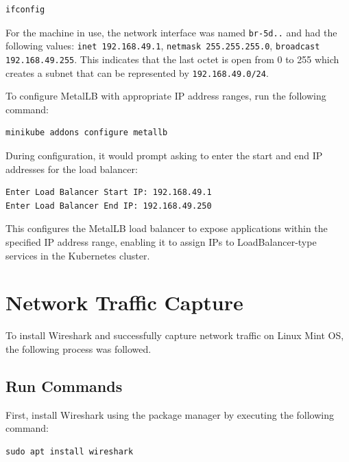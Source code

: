 \begin{lstlisting}[breaklines=true,basicstyle=\small\ttfamily,frame=single]
ifconfig
\end{lstlisting}

For the machine in use, the network interface was named \texttt{br-5d..} and had the following values: \texttt{inet 192.168.49.1}, \texttt{netmask 255.255.255.0}, \texttt{broadcast 192.168.49.255}. This indicates that the last octet is open from 0 to 255 which creates a subnet that can be represented by \texttt{192.168.49.0/24}.

To configure MetalLB with appropriate IP address ranges, run the following command:

\begin{lstlisting}[breaklines=true,basicstyle=\small\ttfamily,frame=single]
minikube addons configure metallb
\end{lstlisting}

During configuration, it would prompt asking to enter the start and end IP addresses for the load balancer:

\begin{lstlisting}[breaklines=true,basicstyle=\small\ttfamily,frame=single]
Enter Load Balancer Start IP: 192.168.49.1
Enter Load Balancer End IP: 192.168.49.250
\end{lstlisting}

This configures the MetalLB load balancer to expose applications within the specified IP address range, enabling it to assign IPs to LoadBalancer-type services in the Kubernetes cluster.


\section{Network Traffic Capture}
To install Wireshark and successfully capture network traffic on Linux Mint OS, the following process was followed.

\subsection{Run Commands}
First, install Wireshark using the package manager by executing the following command:

\begin{lstlisting}[breaklines=true,basicstyle=\small\ttfamily,frame=single]
sudo apt install wireshark
\end{lstlisting}


